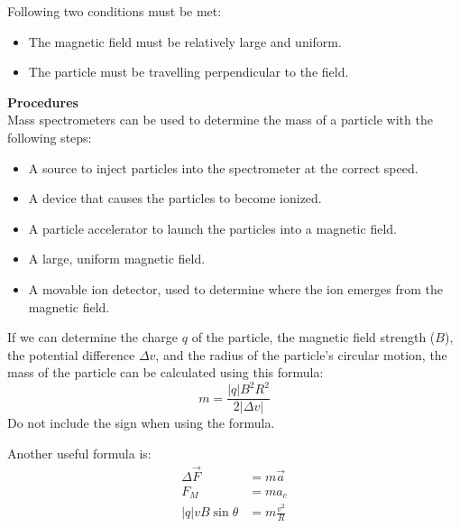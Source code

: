 Following two conditions must be met:
\begin{itemize}
    \item The magnetic field must be relatively large and uniform. 
    \item The particle must be travelling perpendicular to the field. 
\end{itemize}

\textbf{Procedures}\\

Mass spectrometers can be used to determine the mass of a particle with the following steps:
\begin{itemize}
    \item A source to inject particles into the spectrometer at the correct speed.
    \item A device that causes the particles to become ionized.
    \item A particle accelerator to launch the particles into a magnetic field.
    \item A large, uniform magnetic field.
    \item A movable ion detector, used to determine where the ion emerges from the magnetic field.
\end{itemize}

\begin{theorem}
    If we can determine the charge $q$ of the particle, the magnetic field strength ($B$), the potential difference $\Delta v$, and the radius of the particle's circular motion, 
    the mass of the particle can be calculated using this formula:
    \begin{equation*}
        m = \frac{
            \left|q\right| B^2 R^2
        }{
            2 \left|\Delta v\right|
        }
    \end{equation*}
    Do not include the sign when using the formula. 
\end{theorem}

Another useful formula is:
\begin{align*}
    \Delta \vec{F} &= m\vec{a}\\
    F_M &= ma_c\\
    \left|q\right|vB\sin\theta &= m\frac{v^2}{R}
\end{align*}
